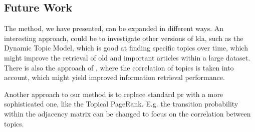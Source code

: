 \subsection{Future Work}\label{sec:future_work}

The method, we have presented, can be expanded in different ways. 
An interesting approach, could be to investigate other versions of \gls{lda}, such as the Dynamic Topic Model\cite{blei2006dynamic}, which is good at finding specific topics over time, which might improve the retrieval of old and important articles within a large dataset.
There is also the approach of \cite{blei2007correlated}, where the correlation of topics is taken into account, which might yield improved information retrieval performance.

Another approach to our method is to replace standard \gls{pr} with a more sophisticated one, like the Topical PageRank\cite{yang2009topic}. 
E.g. the transition probability within the adjacency matrix can be changed to focus on the correlation between topics.
